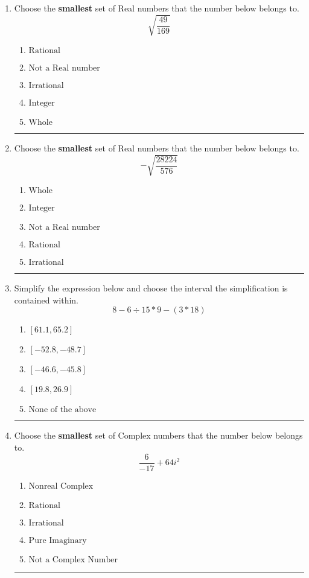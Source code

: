 \documentclass[14pt]{extbook}
\newcommand{\litem}[1]{\item#1\hspace*{-1cm}\rule{\textwidth}{0.4pt}}
\begin{document}
\begin{enumerate}
\litem{
Choose the \textbf{smallest} set of Real numbers that the number below belongs to.\[ \sqrt{\frac{49}{169}} \]\begin{enumerate}[label=\Alph*.]
\item \( \text{Rational} \)
\item \( \text{Not a Real number} \)
\item \( \text{Irrational} \)
\item \( \text{Integer} \)
\item \( \text{Whole} \)

\end{enumerate} }
\litem{
Choose the \textbf{smallest} set of Real numbers that the number below belongs to.\[ -\sqrt{\frac{28224}{576}} \]\begin{enumerate}[label=\Alph*.]
\item \( \text{Whole} \)
\item \( \text{Integer} \)
\item \( \text{Not a Real number} \)
\item \( \text{Rational} \)
\item \( \text{Irrational} \)

\end{enumerate} }
\litem{
Simplify the expression below and choose the interval the simplification is contained within.\[ 8 - 6 \div 15 * 9 - (3 * 18) \]\begin{enumerate}[label=\Alph*.]
\item \( [61.1, 65.2] \)
\item \( [-52.8, -48.7] \)
\item \( [-46.6, -45.8] \)
\item \( [19.8, 26.9] \)
\item \( \text{None of the above} \)

\end{enumerate} }
\litem{
Choose the \textbf{smallest} set of Complex numbers that the number below belongs to.\[ \frac{6}{-17}+64i^2 \]\begin{enumerate}[label=\Alph*.]
\item \( \text{Nonreal Complex} \)
\item \( \text{Rational} \)
\item \( \text{Irrational} \)
\item \( \text{Pure Imaginary} \)
\item \( \text{Not a Complex Number} \)


\end{enumerate}}
\end{enumerate}
\end{document}
